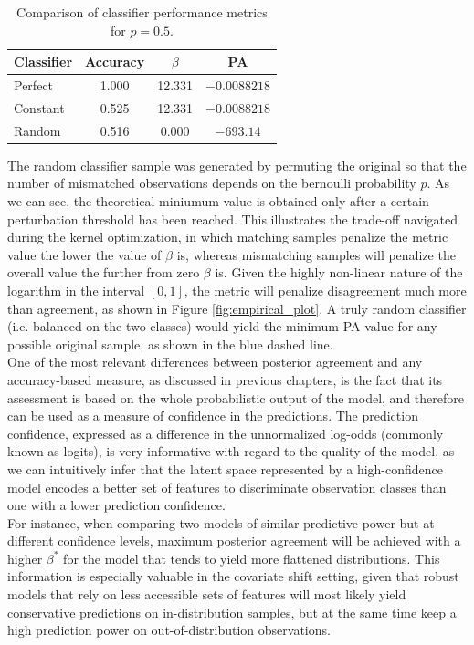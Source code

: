 \begin{table}[H]
    \centering
    \begin{tabular}{lccc}
    Classifier & Accuracy & $\beta$ & PA \\
    \midrule
    Perfect   & 1.000     & 12.331  & $-0.0088218$ \\
    Constant  & 0.525     & 12.331  & $-0.0088218$ \\
    Random    & 0.516     & 0.000   & $-693.14$    \\
    \bottomrule
    \end{tabular}
    \caption{Comparison of classifier performance metrics for $p = 0.5$.}
    \label{tab:empirical_table}
\end{table}

The random classifier sample was generated by permuting the original so 
that the number of mismatched observations depends on the bernoulli probability $p$. 
As we can see, the theoretical miniumum value  is obtained only after
a certain perturbation threshold has been reached. This illustrates the trade-off
navigated during the kernel optimization, in which matching samples penalize the 
metric value the lower the value of $\beta$ is, whereas mismatching samples will
penalize the overall value the further from zero $\beta$ is. Given the highly non-linear
nature of the logarithm in the interval $[0,1]$, the metric will penalize 
disagreement much more than agreement, as shown in Figure \ref{fig:empirical_plot}.
A truly random classifier (i.e. balanced on the two classes) would yield the minimum
PA value for any possible original sample, as shown in the blue dashed line.\\

One of the most relevant differences between posterior agreement and any accuracy-based
measure, as discussed in previous chapters, is the fact that its assessment is based on
the whole probabilistic output of the model, and therefore can be used as a measure of
confidence in the predictions. The prediction confidence, expressed as a difference in 
the unnormalized log-odds (commonly known as logits), is very informative with regard 
to the quality of the model, as we can intuitively infer that the latent 
space represented by a high-confidence model encodes a better set of features 
to discriminate observation classes than one with a lower prediction confidence. \\

For instance, when comparing two models of similar predictive power but at different 
confidence levels, maximum posterior agreement will be achieved with a higher 
$\beta^{*}$ for the model that tends to yield more flattened distributions. This
information is especially valuable in the covariate shift setting, given that robust
models that rely on less accessible sets of features will most likely yield conservative
predictions on in-distribution samples, but at the same time keep a high prediction
power on out-of-distribution observations. \\

